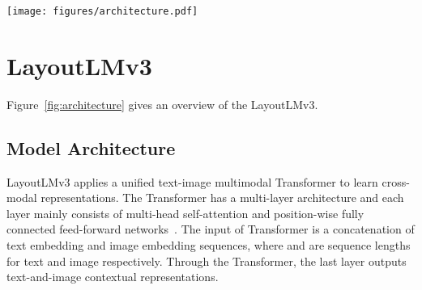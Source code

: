 \documentclass[sigconf]{acmart}
\begin{document}
\begin{figure*}[t]
    \centering
    \texttt{[image: figures/architecture.pdf]}
    \caption{
    \textbf{The architecture and pre-training objectives of LayoutLMv3.}
    LayoutLMv3 is a pre-trained multimodal Transformer for Document AI with unified text and image masking objectives.
    Given an input document image and its corresponding text and layout position information, the model takes the linear projection of patches and word tokens as inputs and encodes them into contextualized vector representations.
    LayoutLMv3 is pre-trained with discrete token reconstructive objectives of Masked Language Modeling (MLM) and Masked Image Modeling (MIM).
    Additionally, LayoutLMv3 is pre-trained with a Word-Patch Alignment (WPA) objective to learn cross-modal alignment by predicting whether the corresponding image patch of a text word is masked. ``Seg'' denotes segment-level positions. ``[CLS]'', ``[MASK]'', ``[SEP]'' and ``[SPE]'' are special tokens.
    } \label{fig:architecture}
\end{figure*}



\section{LayoutLMv3}
Figure~\ref{fig:architecture} gives an overview of the LayoutLMv3.

\subsection{Model Architecture}
LayoutLMv3 applies a unified text-image multimodal Transformer to learn cross-modal representations.
The Transformer has a multi-layer architecture and each layer mainly consists of multi-head self-attention and 
position-wise fully connected 
feed-forward networks~\cite{vaswani2017attention}.
The input of Transformer is a concatenation of text embedding  and image embedding  sequences, where  and  are sequence lengths for text and image respectively.
Through the Transformer, the last layer outputs text-and-image contextual representations.
\end{document}
